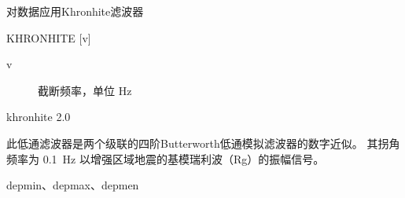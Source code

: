 \label{cmd:khronhite}

对数据应用Khronhite滤波器

\begin{SACSTX}
KHRONHITE [v]
\end{SACSTX}

\begin{description}
\item [v] 截断频率，单位 \si{\Hz}
\end{description}

\begin{SACDFT}
khronhite 2.0
\end{SACDFT}

此低通滤波器是两个级联的四阶Butterworth低通模拟滤波器的数字近似。
其拐角频率为 \SI{0.1}{\Hz} 以增强区域地震的基模瑞利波（Rg）的振幅信号。

depmin、depmax、depmen
